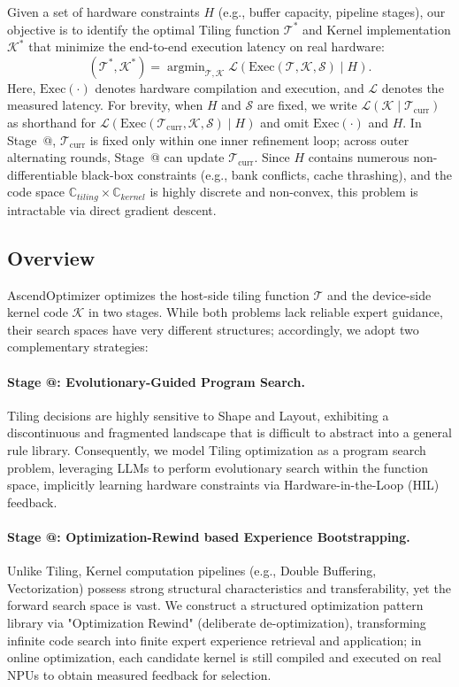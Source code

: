 \documentclass{article}
\makeatletter
\theoremstyle{plain}
\theoremstyle{definition}
\theoremstyle{remark}
\newcommand{\Rmnum}[1]{\expandafter\@slowromancap\romannumeral #1@}
\makeatother
\begin{document}
Given a set of hardware constraints $H$ (e.g., buffer capacity, pipeline stages), our objective is to identify the optimal Tiling function $\mathcal{T}^*$ and Kernel implementation $\mathcal{K}^*$ that minimize the end-to-end execution latency on real hardware:
\begin{equation}
    (\mathcal{T}^*, \mathcal{K}^*) = \mathop{\arg\min}_{\mathcal{T}, \mathcal{K}} \mathcal{L}\left(\text{Exec}(\mathcal{T}, \mathcal{K}, \mathcal{S}) \mid H\right).
\end{equation}
Here, $\text{Exec}(\cdot)$ denotes hardware compilation and execution, and $\mathcal{L}$ denotes the measured latency. For brevity, when $H$ and $\mathcal{S}$ are fixed, we write $\mathcal{L}(\mathcal{K}\mid\mathcal{T}_{\text{curr}})$ as shorthand for $\mathcal{L}\!\left(\text{Exec}(\mathcal{T}_{\text{curr}}, \mathcal{K}, \mathcal{S}) \mid H\right)$ and omit $\text{Exec}(\cdot)$ and $H$. In Stage~\Rmnum{2}, $\mathcal{T}_{\text{curr}}$ is fixed only within one inner refinement loop; across outer alternating rounds, Stage~\Rmnum{1} can update $\mathcal{T}_{\text{curr}}$. Since $H$ contains numerous non-differentiable black-box constraints (e.g., bank conflicts, cache thrashing), and the code space $\mathbb{C}_{tiling} \times \mathbb{C}_{kernel}$ is highly discrete and non-convex, this problem is intractable via direct gradient descent.

\subsection{Overview}

AscendOptimizer optimizes the host-side tiling function $\mathcal{T}$ and the device-side kernel code $\mathcal{K}$ in two stages. While both problems lack reliable expert guidance, their search spaces have very different structures; accordingly, we adopt two complementary strategies:
\paragraph{Stage \Rmnum{1}: Evolutionary-Guided Program Search.} Tiling decisions are highly sensitive to Shape and Layout, exhibiting a discontinuous and fragmented landscape that is difficult to abstract into a general rule library. Consequently, we model Tiling optimization as a program search problem, leveraging LLMs to perform evolutionary search within the function space, implicitly learning hardware constraints via Hardware-in-the-Loop (HIL) feedback.
\paragraph{Stage \Rmnum{2}: Optimization-Rewind based Experience Bootstrapping.} Unlike Tiling, Kernel computation pipelines (e.g., Double Buffering, Vectorization) possess strong structural characteristics and transferability, yet the forward search space is vast. We construct a structured optimization pattern library via "Optimization Rewind" (deliberate de-optimization), transforming infinite code search into finite expert experience retrieval and application; in online optimization, each candidate kernel is still compiled and executed on real NPUs to obtain measured feedback for selection.
\end{document}
